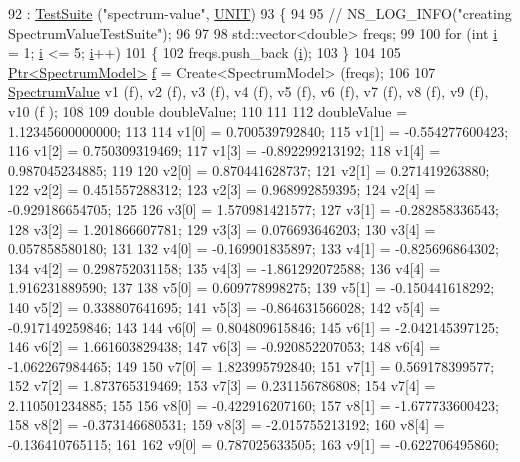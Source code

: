 \begin{DoxyCode}
92   : \hyperlink{classns3_1_1TestSuite_a904b0c40583b744d30908aeb94636d1a}{TestSuite} (\textcolor{stringliteral}{"spectrum-value"}, \hyperlink{classns3_1_1TestSuite_a1ebfcab34ec8161e085e8e3a1855eae0a3885375a3787abf60431f8454b3cadbd}{UNIT})
93 \{
94 
95   \textcolor{comment}{// NS\_LOG\_INFO("creating SpectrumValueTestSuite");}
96 
97 
98   std::vector<double> freqs;
99 
100   \textcolor{keywordflow}{for} (\textcolor{keywordtype}{int} \hyperlink{bernuolliDistribution_8m_a6f6ccfcf58b31cb6412107d9d5281426}{i} = 1; \hyperlink{bernuolliDistribution_8m_a6f6ccfcf58b31cb6412107d9d5281426}{i} <= 5; \hyperlink{bernuolliDistribution_8m_a6f6ccfcf58b31cb6412107d9d5281426}{i}++)
101     \{
102       freqs.push\_back (\hyperlink{bernuolliDistribution_8m_a6f6ccfcf58b31cb6412107d9d5281426}{i});
103     \}
104 
105   \hyperlink{classns3_1_1Ptr}{Ptr<SpectrumModel>} \hyperlink{buildings__pathloss_8m_aa52d3a6e3de5a80a97c12364caeaa125}{f} = Create<SpectrumModel> (freqs);
106 
107   \hyperlink{classns3_1_1SpectrumValue}{SpectrumValue} v1 (f), v2 (f), v3 (f), v4 (f), v5 (f), v6 (f), v7 (f), v8 (f), v9 (f), v10 (f
      );
108 
109   \textcolor{keywordtype}{double} doubleValue;
110 
111 
112   doubleValue =  1.12345600000000;
113 
114   v1[0] =  0.700539792840;
115   v1[1] = -0.554277600423;
116   v1[2] =  0.750309319469;
117   v1[3] = -0.892299213192;
118   v1[4] =  0.987045234885;
119 
120   v2[0] =  0.870441628737;
121   v2[1] =  0.271419263880;
122   v2[2] =  0.451557288312;
123   v2[3] =  0.968992859395;
124   v2[4] = -0.929186654705;
125 
126   v3[0] =  1.570981421577;
127   v3[1] = -0.282858336543;
128   v3[2] =  1.201866607781;
129   v3[3] =  0.076693646203;
130   v3[4] =  0.057858580180;
131 
132   v4[0] = -0.169901835897;
133   v4[1] = -0.825696864302;
134   v4[2] =  0.298752031158;
135   v4[3] = -1.861292072588;
136   v4[4] =  1.916231889590;
137 
138   v5[0] =  0.609778998275;
139   v5[1] = -0.150441618292;
140   v5[2] =  0.338807641695;
141   v5[3] = -0.864631566028;
142   v5[4] = -0.917149259846;
143 
144   v6[0] =  0.804809615846;
145   v6[1] = -2.042145397125;
146   v6[2] =  1.661603829438;
147   v6[3] = -0.920852207053;
148   v6[4] = -1.062267984465;
149 
150   v7[0] =  1.823995792840;
151   v7[1] =  0.569178399577;
152   v7[2] =  1.873765319469;
153   v7[3] =  0.231156786808;
154   v7[4] =  2.110501234885;
155 
156   v8[0] = -0.422916207160;
157   v8[1] = -1.677733600423;
158   v8[2] = -0.373146680531;
159   v8[3] = -2.015755213192;
160   v8[4] = -0.136410765115;
161 
162   v9[0] =  0.787025633505;
163   v9[1] = -0.622706495860;

\end{DoxyCode}
